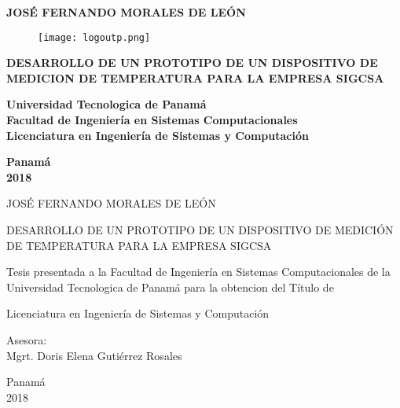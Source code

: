 \begin{titlepage}
	\centering
	\large
	
	\textbf{JOSÉ FERNANDO MORALES DE LEÓN}
	
	\vfill
	
	\begin{figure}[H]
		\centering
		\texttt{[image: logoutp.png]}
	\end{figure}

	\vfill
	
	\textbf{DESARROLLO DE UN PROTOTIPO DE UN DISPOSITIVO DE
	MEDICION DE TEMPERATURA PARA LA EMPRESA SIGCSA}
	
	\vfill
	
	\textbf{Universidad Tecnologica de Panamá \\
	Facultad de Ingeniería en Sistemas Computacionales \\
	Licenciatura en Ingeniería de Sistemas y Computación}
	
	\vfill
	
	\textbf{Panamá\\
	2018}
		
\end{titlepage}
\clearpage

\thispagestyle{headings}
\mbox{}
\clearpage

\thispagestyle{empty}

\begin{center}

\large
JOSÉ FERNANDO MORALES DE LEÓN

\vfill

DESARROLLO DE UN PROTOTIPO DE UN DISPOSITIVO DE
MEDICIÓN DE TEMPERATURA PARA LA EMPRESA SIGCSA

\vfill

Tesis presentada a la Facultad de Ingeniería en Sistemas
Computacionales de la Universidad Tecnologica de Panamá
para la obtencion del Título de

\vfill

Licenciatura en Ingeniería de Sistemas y Computación

\vfill

Asesora:\\
Mgrt. Doris Elena Gutiérrez Rosales

\vfill
Panamá\\
2018

\end{center}

\clearpage

\thispagestyle{headings}
\mbox{}
\clearpage

